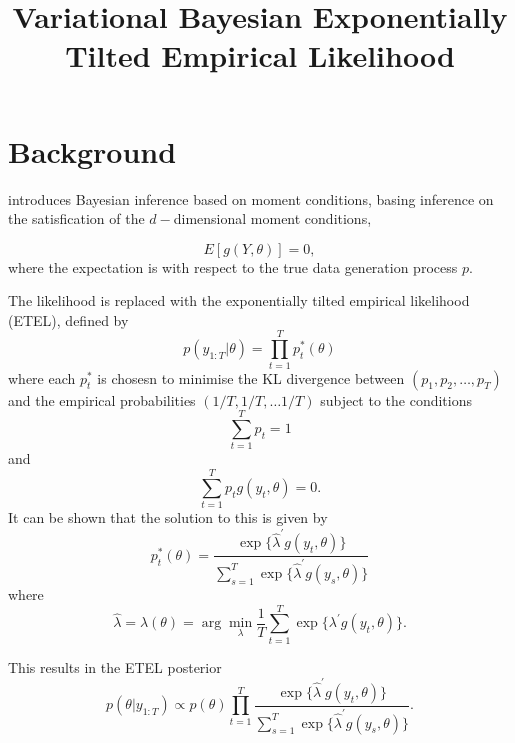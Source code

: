 \documentclass[12pt,a4paper]{article}\usepackage[]{graphicx}\usepackage[]{color}
\title{Variational Bayesian Exponentially Tilted Empirical Likelihood}
\begin{document}
\maketitle

\section{Background}

\citet{Chib2017} introduces Bayesian inference based on moment conditions, basing inference on the satisfication of the $d-$dimensional moment conditions,

\begin{equation}
\label{emp:moments}
E \left[ g(Y, \theta) \right] = 0,
\end{equation}
where the expectation is with respect to the true data generation process $p$.

The likelihood is replaced with the exponentially tilted empirical likelihood (ETEL), defined by
\begin{equation}
\label{emp:etel}
p(y_{1:T} | \theta) = \prod_{t=1}^T p^*_t(\theta)
\end{equation}
where each $p^*_t$ is chosesn to minimise the KL divergence between $(p_1, p_2, \ldots, p_T)$ and the empirical probabilities $(1/T, 1/T, \ldots 1/T)$ subject to the conditions
\begin{equation}
\label{emp:sumRestrict}
\sum_{t=1}^T p_t = 1
\end{equation}
and
\begin{equation}
\label{emp:momentRestrict}
\sum_{t=1}^T p_t g(y_t, \theta) = 0.
\end{equation}
It can be shown that the solution to this is given by
\begin{equation}
\label{emp:solnP}
p^*_t(\theta) = \frac{\exp \{\hat{\lambda}^{\prime} g(y_t, \theta) \}}{ \sum_{s=1}^T \exp \{\hat{\lambda}^{\prime} g(y_s, \theta) \}}
\end{equation}
where
\begin{equation}
\label{emp:solnLambda}
\hat{\lambda} = \lambda(\theta) = \arg \underset{\lambda}{\min} \frac{1}{T} \sum_{t=1}^T \exp \{\lambda^{\prime} g(y_t, \theta) \}.
\end{equation}

This results in the ETEL posterior
\begin{equation}
\label{emp:post}
p(\theta | y_{1:T}) \propto p(\theta) \prod_{t=1}^T\frac{\exp \{\hat{\lambda}^{\prime} g(y_t, \theta) \}}{ \sum_{s=1}^T \exp \{\hat{\lambda}^{\prime} g(y_s, \theta) \}}.
\end{equation}
\end{document}
